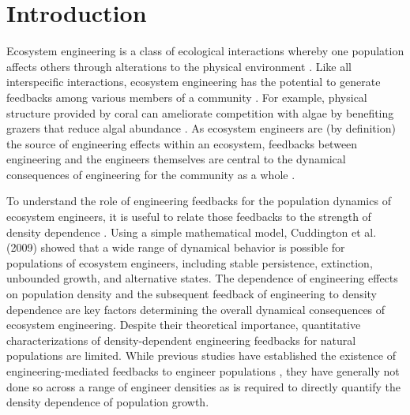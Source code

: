 \section*{Introduction}

Ecosystem engineering is a class of ecological interactions whereby 
one population affects others through alterations to the physical environment 
\citep{jones1994, wilby2002}.
Like all interspecific interactions, 
ecosystem engineering has the potential to generate feedbacks among various 
members of a community \citep{bertness1997,largaespada2012,donadi2014,sanders2014}.
For example, physical structure provided by coral can ameliorate competition with algae by
benefiting grazers that reduce algal abundance \citep{bozec2013}. 
As ecosystem engineers are (by definition) the source 
of engineering effects within an ecosystem, 
feedbacks between engineering and the engineers themselves are central 
to the dynamical consequences of engineering for the community as a whole 
\citep{hastings2007, sanders2014}. 

To understand the role of engineering feedbacks
for the population dynamics of ecosystem engineers,
it is useful to relate those feedbacks to the strength of density dependence
\citep{hastings2007, cuddington2009}.
Using a simple mathematical model,
Cuddington et al. (2009) showed that a wide range of dynamical behavior
is possible for populations of ecosystem engineers,
including stable persistence, extinction, unbounded growth, and alternative states.
The dependence of engineering effects on population density and 
the subsequent feedback of engineering to density dependence 
are key factors determining the overall dynamical consequences of ecosystem engineering.
Despite their theoretical importance,
quantitative characterizations of density-dependent 
engineering feedbacks for natural populations are limited.
While previous studies have established the existence of engineering-mediated feedbacks
to engineer populations \citep[e.g.,][]{largaespada2012, bozec2013, donadi2014},
they have generally not done so across a range of engineer densities 
as is required to directly quantify the density dependence of population growth.
 
